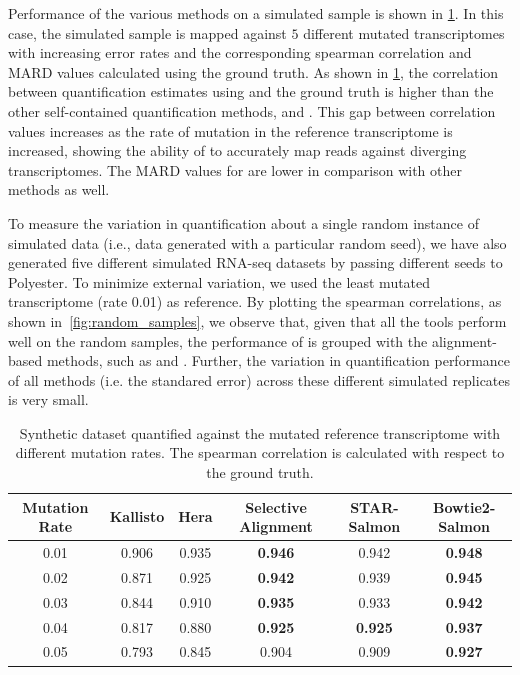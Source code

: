 Performance of the various methods on a simulated sample is shown in \cref{tab:diff_mutation}. In this case, 
the simulated sample is mapped against $5$ different mutated transcriptomes with increasing error rates and the 
corresponding spearman correlation and MARD values calculated using the ground truth. As shown in 
\cref{tab:diff_mutation}, the correlation between quantification estimates using \sla and the ground truth is 
higher than the other self-contained quantification methods, \kallisto and \hera. This gap between correlation 
values increases as the rate of mutation in the reference transcriptome is increased, showing the ability of 
\sla to accurately map reads against diverging transcriptomes. The MARD values for \sla are lower in comparison 
with other \nab methods as well.

To measure the variation in quantification about a single random instance of simulated data (i.e., data generated 
with a particular random seed), we have also generated five different simulated RNA-seq datasets by passing 
different seeds to Polyester. To minimize external variation, we used the least mutated transcriptome 
(rate 0.01) as reference. By plotting the spearman correlations, as shown in~\cref{fig:random_samples}, 
we observe that, given that all the tools perform well on the random samples, the performance of \sla is grouped 
with the alignment-based methods, such as \bt and \STAR.  Further, the variation in quantification performance of 
all methods (i.e. the standared error) across these different simulated replicates is very small.

\begin{table}
\begin{center}
\begin{tabular} {c|c c c c c}
\toprule
  Mutation Rate & Kallisto & Hera & Selective Alignment & STAR-Salmon &Bowtie2-Salmon \\
\midrule
  0.01 & 0.906 & 0.935 & \textbf{0.946} & 0.942 & \textbf{0.948} \\
  0.02 & 0.871 & 0.925 & \textbf{0.942} & 0.939 & \textbf{0.945} \\
  0.03 & 0.844 & 0.910 & \textbf{0.935} & 0.933 & \textbf{0.942} \\
  0.04 & 0.817 & 0.880 & \textbf{0.925} & \textbf{0.925} & \textbf{0.937} \\
  0.05 & 0.793 & 0.845 & 0.904 & 0.909 & \textbf{0.927} \\
\bottomrule
\end{tabular}
\caption[Acuracy of qunatification of synthetic dataset against the mutated reference transcriptome]{
  {Synthetic dataset quantified against the mutated reference transcriptome with different mutation rates. 
  The spearman correlation is calculated with respect to the ground truth.}
}
\vspace{-0.3in}
\label{tab:diff_mutation}
\end{center}
\end{table}

